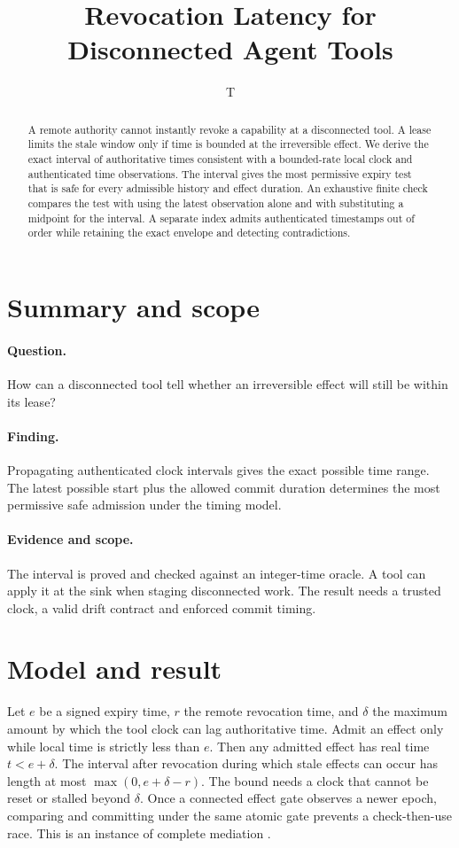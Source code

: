 \documentclass[11pt]{article}
\title{Revocation Latency for Disconnected Agent Tools}
\author{T}
\date{}
\begin{document}
\maketitle
\begin{abstract}
A remote authority cannot instantly revoke a capability at a disconnected
tool. A lease limits the stale window only if time is bounded at the
irreversible effect. We derive the exact interval of authoritative
times consistent with a bounded-rate local clock and authenticated
time observations. The interval gives the most permissive expiry
test that is safe for every admissible history and effect duration.
An exhaustive finite check compares the test with using the latest
observation alone and with substituting a midpoint for the interval.
A separate index admits authenticated timestamps out of order while
retaining the exact envelope and detecting contradictions.
\end{abstract}

\section*{Summary and scope}
\paragraph{Question.} How can a disconnected tool tell whether an
irreversible effect will still be within its lease?
\paragraph{Finding.} Propagating authenticated clock intervals gives the
exact possible time range. The latest possible start plus the allowed
commit duration determines the most permissive safe admission under the
timing model.
\paragraph{Evidence and scope.} The interval is proved and
checked against an integer-time oracle. A tool can apply it at the sink
when staging disconnected work. The result needs a trusted clock, a valid
drift contract and enforced commit timing.

\section{Model and result}
Let $e$ be a signed expiry time, $r$ the remote revocation time, and $\delta$ the maximum amount by which the tool clock can lag authoritative time. Admit an effect only while local time is strictly less than $e$. Then any admitted effect has real time $t<e+\delta$. The interval after revocation during which stale effects can occur has length at most $\max(0,e+\delta-r)$. The bound needs a clock that cannot be reset or stalled beyond $\delta$. Once a connected effect gate observes a newer epoch, comparing and committing under the same atomic gate prevents a check-then-use race. This is an instance of complete mediation \cite{saltzer}.
\end{document}
